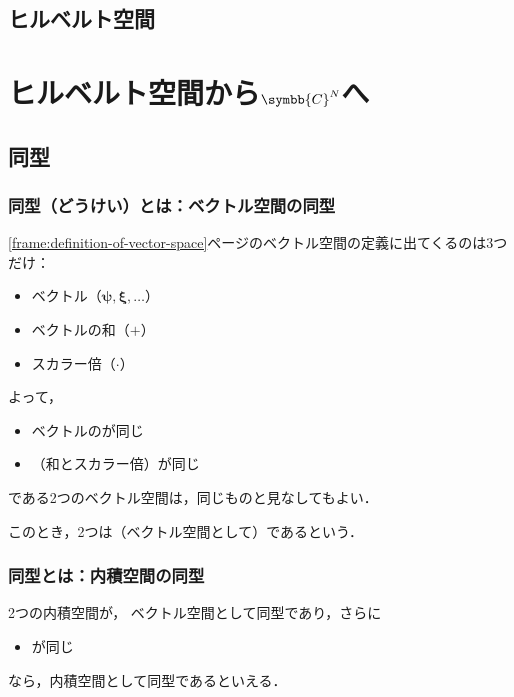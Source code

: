 \documentclass[
    10pt,
    ]{sotsu-beamer}
\begin{document}
\subsection{ヒルベルト空間}





\section{ヒルベルト空間から\texorpdfstring{$\symbb{C}^N$}{ℂ\textasciicircum 𝑁}へ}

\subsection{同型}


\begin{frame}
    \frametitle{同型（どうけい）とは：ベクトル空間の同型}

    \ref{frame:definition-of-vector-space}ページのベクトル空間の定義に出てくるのは3つだけ：
    \begin{itemize}
        \item ベクトル（$\symbf{\psi}, \symbf{\xi}, \dotsc$）
        \item ベクトルの和（$+$）
        \item スカラー倍（$\cdotp$）
    \end{itemize}

    \pause

    よって，
    \begin{itemize}
        \item ベクトルのが同じ
        \item {}（和とスカラー倍）が同じ
    \end{itemize}
    である2つのベクトル空間は，同じものと見なしてもよい．

    このとき，2つは（ベクトル空間として）であるという．
    
\end{frame}


\begin{frame}
    \frametitle{同型とは：内積空間の同型}

    2つの内積空間が，
    ベクトル空間として同型であり，さらに
    \begin{itemize}
        \item {}が同じ
    \end{itemize}
    なら，内積空間として同型であるといえる．

\end{frame}
\end{document}
